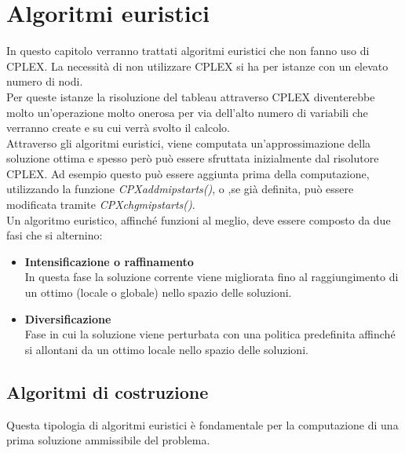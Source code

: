 \chapter{Algoritmi euristici}\label{HEURISTIC}
In questo capitolo verranno trattati algoritmi euristici che non fanno uso di CPLEX. La necessità di non utilizzare CPLEX si ha per istanze con un elevato numero di nodi.\\
Per queste istanze la risoluzione del tableau attraverso CPLEX diventerebbe molto un'operazione molto onerosa per via dell'alto numero di variabili che verranno create e su cui verrà svolto il calcolo.\\
Attraverso gli algoritmi euristici, viene computata un'approssimazione della soluzione ottima e spesso però può essere sfruttata inizialmente dal risolutore CPLEX. Ad esempio questo può essere aggiunta prima della computazione, utilizzando la funzione \textit{CPXaddmipstarts()}, o ,se già definita, può essere modificata tramite \textit{CPXchgmipstarts()}.\\
Un algoritmo euristico, affinché funzioni al meglio, deve essere composto da due fasi che si alternino:
\begin{itemize}
\item{\textbf{Intensificazione o raffinamento}\\
In questa fase la soluzione corrente viene migliorata fino al raggiungimento di un ottimo (locale o globale) nello spazio delle soluzioni.
}
\item{\textbf{Diversificazione}\\
Fase in cui la soluzione viene perturbata con una politica predefinita affinché si allontani da un ottimo locale nello spazio delle soluzioni.
}
\end{itemize}


\section{Algoritmi di costruzione}\label{construction_alg}
Questa tipologia di algoritmi euristici è fondamentale per la computazione di una prima soluzione ammissibile del problema.
